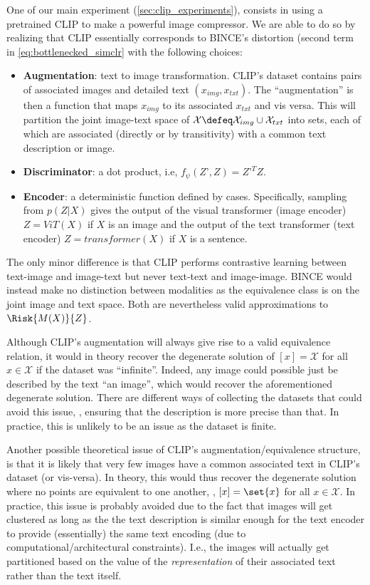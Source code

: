 \documentclass[final]{article}
\begin{document}
One of our main experiment (\cref{sec:clip_experiments}), consists in using a pretrained CLIP to make a powerful image compressor.
We are able to do so by realizing that CLIP essentially corresponds to BINCE's distortion (second term in \cref{eq:bottlenecked_simclr} with the following choices: 
\begin{itemize}
\item \textbf{Augmentation}: text to image transformation. CLIP’s dataset contains pairs of associated images and detailed text  $(x_{img},x_{txt})$. The ``augmentation'' is then a function that maps $x_{img}$ to its associated  $x_{txt}$ and vis versa.
This will partition the joint image-text space of $\mathcal{X} \defeq \mathcal{X}_{img} \cup \mathcal{X}_{txt}$ into sets, each of which are associated (directly or by transitivity) with a common text description or image.
\item \textbf{Discriminator}: a dot product, i.e, $f_{\psi}(Z’,Z) = Z’^T Z$.
\item \textbf{Encoder}: a deterministic function defined by cases. Specifically, sampling from $p(Z|X)$ gives the output of the visual transformer (image encoder) $Z = ViT(X)$ if $X$ is an image and the output of the text transformer (text encoder) $Z = transformer(X)$ if $X$ is a sentence.
\end{itemize}

The only minor difference is that CLIP performs contrastive learning between text-image and image-text but never text-text and image-image. BINCE would instead make no distinction between modalities as the equivalence class is on the joint image and text space. Both are nevertheless valid approximations to $\Risk{M(X)}{Z}$.

Although CLIP's augmentation will always give rise to a valid equivalence relation, 
it would in theory recover the degenerate solution of $[x] = \mathcal{X}$ for all $x \in \mathcal{X}$ if the dataset was ``infinite''.
Indeed, any image could possible just be described by the text ``an image'', which would recover the aforementioned degenerate solution. 
There are different ways of collecting the datasets that could avoid this issue, \eg, ensuring that the description is more precise than that.
In practice, this is unlikely to be an issue as the dataset is finite.

Another possible theoretical issue of CLIP's augmentation/equivalence structure, is that it is likely that very few images have a common associated text in CLIP's dataset (or vis-versa). 
In theory, this would thus recover the degenerate solution where no points are equivalent to one another, \ie, $[x] = \set{x}$ for all $x \in \mathcal{X}$.
In practice, this issue is probably avoided due to the fact that images will get clustered as long as the the text description is similar enough for the text encoder to provide (essentially) the same text encoding (due to computational/architectural constraints). 
I.e., the images will actually get partitioned based on the value of the \textit{representation} of their associated text rather than the text itself.  
\end{document}
